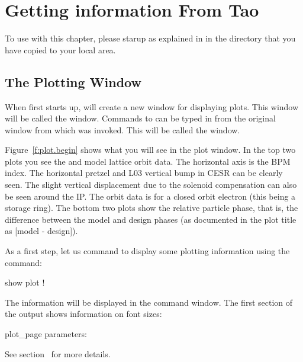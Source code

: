 \chapter{Getting information From Tao}
\label{c:get.info}

To use \tao with this chapter, please starup \tao as explained in  in 
the  directory that you have copied to your local area.

\section{The Plotting Window}

When \tao first starts up, \tao will create a new window for
displaying plots. This window will be called the 
window. Commands to \tao can be typed in from the original window from
which \tao was invoked. This will be called the  window.

Figure~\ref{f:plot.begin} shows what you will see in the plot window. In the top two plots you see
the  and  model lattice orbit data. The horizontal axis is the \cesr BPM index. The
horizontal pretzel and L03 vertical bump in CESR can be clearly seen. The slight vertical
displacement due to the solenoid compensation can also be seen around the IP. The orbit data is for
a closed orbit electron (this being a storage ring). The bottom two plots show the relative particle
phase, that is, the difference between the model and design phases (as documented in the plot title
as [model - design]). 

As a first step, let us command \tao to display some plotting
information using the command:
\begin{example}
  show plot       ! 
\end{example}
The information will be displayed in the command window. The first
section of the  output shows information on font sizes:
\begin{example}
  plot_page parameters:
\end{example}
See section~ for more details. 

